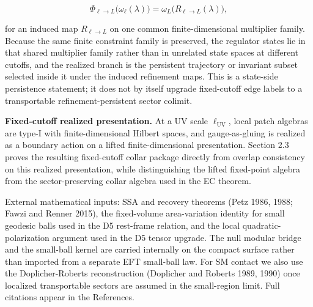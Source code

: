 \[
\Phi_{\ell\to L}\bigl(\omega_{\ell}(\lambda)\bigr)=\omega_{L}\!\bigl(R_{\ell\to L}(\lambda)\bigr),
\]

for an induced map \(R_{\ell\to L}\) on one common finite-dimensional multiplier family. Because the same finite constraint family is preserved, the regulator states lie in that shared multiplier family rather than in unrelated state spaces at different cutoffs, and the realized branch is the persistent trajectory or invariant subset selected inside it under the induced refinement maps. This is a state-side persistence statement; it does not by itself upgrade fixed-cutoff edge labels to a transportable refinement-persistent sector colimit.

\textbf{Fixed-cutoff realized presentation.} At a UV scale \(\ell_{\mathrm{UV}}\), local patch algebras are type-I with finite-dimensional Hilbert spaces, and gauge-as-gluing is realized as a boundary action on a lifted finite-dimensional presentation. Section 2.3 proves the resulting fixed-cutoff collar package directly from overlap consistency on this realized presentation, while distinguishing the lifted fixed-point algebra from the sector-preserving collar algebra used in the EC theorem.

External mathematical inputs: SSA and recovery theorems (Petz 1986, 1988; Fawzi and Renner 2015), the fixed-volume area-variation identity for small geodesic balls used in the D5 rest-frame relation, and the local quadratic-polarization argument used in the D5 tensor upgrade. The null modular bridge and the small-ball kernel are carried internally on the compact surface rather than imported from a separate EFT small-ball law. For SM contact we also use the Doplicher-Roberts reconstruction (Doplicher and Roberts 1989, 1990) once localized transportable sectors are assumed in the small-region limit. Full citations appear in the References.

